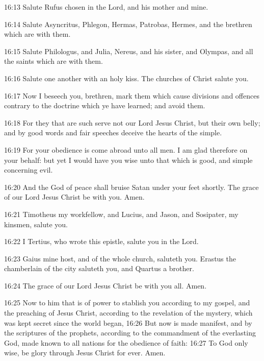 16:13 Salute Rufus chosen in the Lord, and his mother and mine.

16:14 Salute Asyncritus, Phlegon, Hermas, Patrobas, Hermes, and the brethren which are with them.

16:15 Salute Philologus, and Julia, Nereus, and his sister, and Olympas, and all the saints which are with them.

16:16 Salute one another with an holy kiss. The churches of Christ salute you.

16:17 Now I beseech you, brethren, mark them which cause divisions and offences contrary to the doctrine which ye have learned; and avoid them.

16:18 For they that are such serve not our Lord Jesus Christ, but their own belly; and by good words and fair speeches deceive the hearts of the simple.

16:19 For your obedience is come abroad unto all men. I am glad therefore on your behalf: but yet I would have you wise unto that which is good, and simple concerning evil.

16:20 And the God of peace shall bruise Satan under your feet shortly.  The grace of our Lord Jesus Christ be with you. Amen.

16:21 Timotheus my workfellow, and Lucius, and Jason, and Sosipater, my kinsmen, salute you.

16:22 I Tertius, who wrote this epistle, salute you in the Lord.

16:23 Gaius mine host, and of the whole church, saluteth you. Erastus the chamberlain of the city saluteth you, and Quartus a brother.

16:24 The grace of our Lord Jesus Christ be with you all. Amen.

16:25 Now to him that is of power to stablish you according to my gospel, and the preaching of Jesus Christ, according to the revelation of the mystery, which was kept secret since the world began, 16:26 But now is made manifest, and by the scriptures of the prophets, according to the commandment of the everlasting God, made known to all nations for the obedience of faith: 16:27 To God only wise, be glory through Jesus Christ for ever. Amen.


